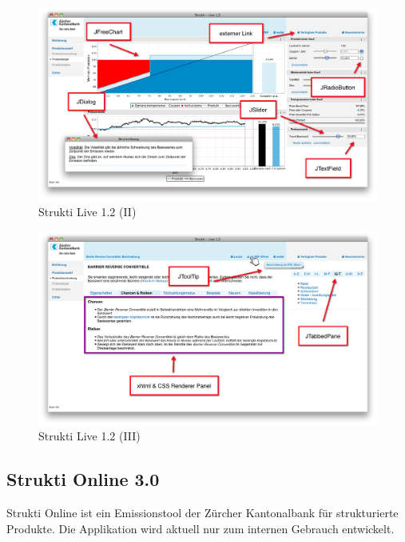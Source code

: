   \begin{figure}[htb]
    \begin{center}
      \includegraphics[width=\textwidth]{./image/SL/SL-02.png}
      \caption{Strukti Live 1.2 (II)}
      \label{img:SL-02}
    \end{center}
  \end{figure}
  
  \begin{figure}[htb]
    \begin{center}
      \includegraphics[width=\textwidth]{./image/SL/SL-03.png}
      \caption{Strukti Live 1.2 (III)}
      \label{img:SL-03}
    \end{center}
  \end{figure}
  
  \subsection{Strukti Online 3.0}
  
  Strukti Online ist ein Emissionstool der Zürcher Kantonalbank für
  strukturierte Produkte. Die Applikation wird aktuell nur zum internen
  Gebrauch entwickelt.
  
